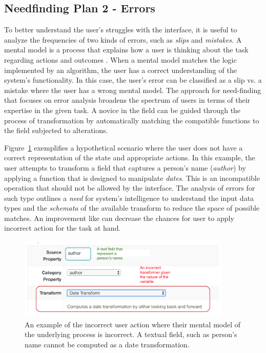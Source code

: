 \documentclass[12pt,letterpaper]{article}
\begin{document}
\subsection*{Needfinding Plan 2 - Errors}
To better understand the user's struggles with the interface, it is useful to analyze the frequencies of two kinds of errors, such as \textit{slips} and \textit{mistakes}. A mental model is a process that explains how a user is thinking about the task regarding actions and outcomes \cite{wiki:mental_model}. When a mental model matches the logic implemented by an algorithm, the user has a correct understanding of the system's functionality. In this case, the user's error can be classified as a slip vs. a mistake where the user has a wrong mental model. The approach for need-finding that focuses on error analysis broadens the spectrum of users in terms of their expertise in the given task. A novice in the field can be guided through the process of transformation by automatically matching the compatible functions to the field subjected to alterations. 

Figure~\ref{fig::5} exemplifies a hypothetical scenario where the user does not have a correct representation of the state and appropriate actions. In this example, the user attempts to transform a field that captures a person's name (\textit{author}) by applying a function that is designed to manipulate \textit{dates}. This is an incompatible operation that should not be allowed by the interface. The analysis of errors for such type outlines a \textit{need} for system's intelligence to understand the input data types and the \textit{schemata} of the available transform to reduce the space of possible matches. An improvement like can decrease the chances for user to apply incorrect action for the task at hand.   

\begin{figure}[h]
\centering
\includegraphics[width=4in, scale=.3]{mistake.png}
\caption{An example of the incorrect user action where their mental model of the underlying process is incorrect. A textual field, such as person's name cannot be computed as a date transformation.}
\label{fig::5}
\end{figure}
\end{document}
